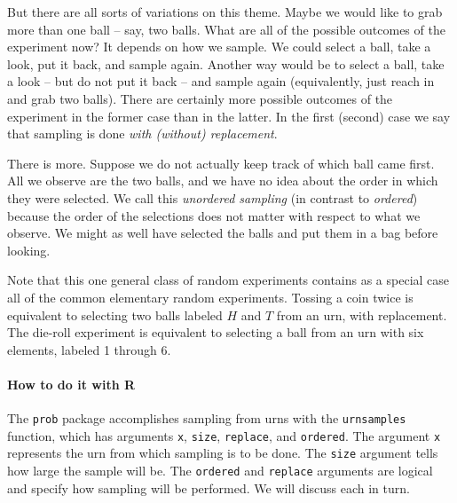 \documentclass[captions=tableheading]{scrbook}
\begin{document}
But there are all sorts of variations on this theme. Maybe we would like to grab more than one ball -- say, two balls. What are all of the possible outcomes of the experiment now? It depends on how we sample. We could select a ball, take a look, put it back, and sample again. Another way would be to select a ball, take a look -- but do not put it back -- and sample again (equivalently, just reach in and grab two balls). There are certainly more possible outcomes of the experiment in the former case than in the latter. In the first (second) case we say that sampling is done \emph{with (without) replacement}.

There is more. Suppose we do not actually keep track of which ball came first. All we observe are the two balls, and we have no idea about the order in which they were selected. We call this \emph{unordered sampling} (in contrast to \emph{ordered}) because the order of the selections does not matter with respect to what we observe. We might as well have selected the balls and put them in a bag before looking.

Note that this one general class of random experiments contains as a special case all of the common elementary random experiments. Tossing a coin twice is equivalent to selecting two balls labeled \(H\) and \(T\) from an urn, with replacement. The die-roll experiment is equivalent to selecting a ball from an urn with six elements, labeled 1 through 6.

\paragraph*{How to do it with \textsf{R}} 

The \texttt{prob} package accomplishes sampling from urns with the \texttt{urnsamples} function, which has arguments \texttt{x}, \texttt{size}, \texttt{replace}, and \texttt{ordered}. The argument \texttt{x} represents the urn from which sampling is to be done. The \texttt{size} argument tells how large the sample will be. The \texttt{ordered} and \texttt{replace} arguments are logical and specify how sampling will be performed. We will discuss each in turn.
\end{document}
